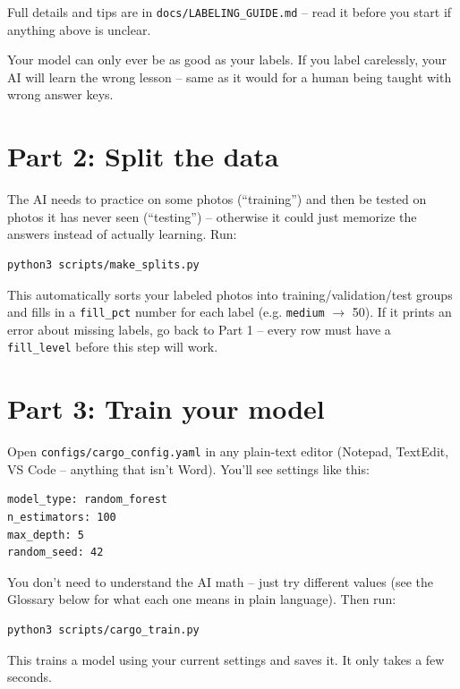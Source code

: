 \documentclass[11pt]{article}
\begin{document}
Full details and tips are in \texttt{docs/LABELING\_GUIDE.md} -- read it
before you start if anything above is unclear.

\begin{tipbox}
Your model can only ever be as good as your labels. If you label
carelessly, your AI will learn the wrong lesson -- same as it would for a
human being taught with wrong answer keys.
\end{tipbox}

\section*{Part 2: Split the data}
The AI needs to practice on some photos (``training'') and then be tested on
photos it has never seen (``testing'') -- otherwise it could just memorize
the answers instead of actually learning. Run:

\begin{lstlisting}
python3 scripts/make_splits.py
\end{lstlisting}

This automatically sorts your labeled photos into training/validation/test
groups and fills in a \texttt{fill\_pct} number for each label (e.g.
\texttt{medium} $\rightarrow$ 50). If it prints an error about missing
labels, go back to Part 1 -- every row must have a \texttt{fill\_level}
before this step will work.

\section*{Part 3: Train your model}
Open \texttt{configs/cargo\_config.yaml} in any plain-text editor (Notepad,
TextEdit, VS Code -- anything that isn't Word). You'll see settings like
this:

\begin{lstlisting}
model_type: random_forest
n_estimators: 100
max_depth: 5
random_seed: 42
\end{lstlisting}

You don't need to understand the AI math -- just try different values (see
the Glossary below for what each one means in plain language). Then run:

\begin{lstlisting}
python3 scripts/cargo_train.py
\end{lstlisting}

This trains a model using your current settings and saves it. It only takes
a few seconds.
\end{document}
